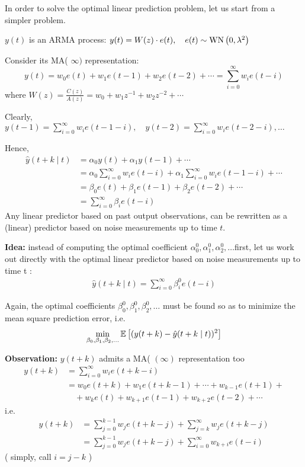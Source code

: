 
In order to solve the optimal linear prediction problem, let us start from a simpler problem.

$y(t)$ is an ARMA process: $y(t)=W(z) \cdot e(t),\quad e(t) \sim \operatorname{WN}\left(0, \lambda^{2}\right)$

Consider its MA( $\infty)$ representation:
$$
y(t)=w_{0} e(t)+w_{1} e(t-1)+w_{2} e(t-2)+\cdots=\sum_{i=0}^{\infty} w_{i} e(t-i)
$$
where $W(z)=\frac{C(z)}{A(z)}=w_{0}+w_{1} z^{-1}+w_{2} z^{-2}+\cdots$

Clearly, $ y(t-1)=\sum_{i=0}^{\infty} w_{i} e(t-1-i), \quad y(t-2)=\sum_{i=0}^{\infty} w_{i} e(t-2-i),\ldots$

Hence,
\begin{align*}
	\hat{y}(t+k \mid t) &=\alpha_{0} y(t)+\alpha_{1} y(t-1)+\cdots \\
	&=\alpha_{0} \sum_{i=0}^{\infty} w_{i} e(t-i)+\alpha_{1} \sum_{i=0}^{\infty} w_{i} e(t-1-i)+\cdots \\
	&=\beta_{0} e(t)+\beta_{1} e(t-1)+\beta_{2} e(t-2)+\cdots\\
	&=\sum_{i=0}^{\infty} \beta_{i} e(t-i)
\end{align*}
Any linear predictor based on past output observations, can be rewritten as a (linear) predictor based on noise measurements up to time $t$.

\textbf{Idea:} instead of computing the optimal coefficient $\alpha_{0}^{0},\alpha_{1}^{0},\alpha_{2}^{0},\ldots $first, 
let us work out directly with the optimal linear predictor based on 
noise measurements up to time t :
\begin{align*}
	\hat{y}(t+k \mid t) = \sum_{i=0}^{\infty} \beta_{i}^0 e(t-i)
\end{align*}

Again, the optimal coefficients $\beta_{0}^{0}, \beta_{1}^{0}, \beta_{2}^{0}, \ldots$ must be found so as to minimize the mean square prediction error, i.e.
$$
\min _{\beta_{0}, \beta_{1}, \beta_{2}, \ldots} \mathbb{E}\left[(y(t+k)-\hat{y}(t+k \mid t))^{2}\right]
$$

\textbf{Observation:} $y(t+k)$ admits a MA( $(\infty)$ representation too
\begin{align*}
	y(t+k)&= \sum_{i=0}^{\infty} w_{i} e(t+k-i) \\
	&= w_{0} e(t+k)+w_{1} e(t+k-1)+\cdots+w_{k-1} e(t+1)+\\
	&\quad+w_{k} e(t)+w_{k+1} e(t-1)+w_{k+2} e(t-2)+\cdots
\end{align*}
i.e.
\begin{align*}
	y(t+k) &=\sum_{j=0}^{k-1} w_{j} e(t+k-j)+\sum_{j=k}^{\infty} w_{j} e(t+k-j) \\
	&=\sum_{j=0}^{k-1} w_{j} e(t+k-j)+\sum_{i=0}^{\infty} w_{k+i} e(t-i)
\end{align*}
( simply, call $i=j-k$ )

